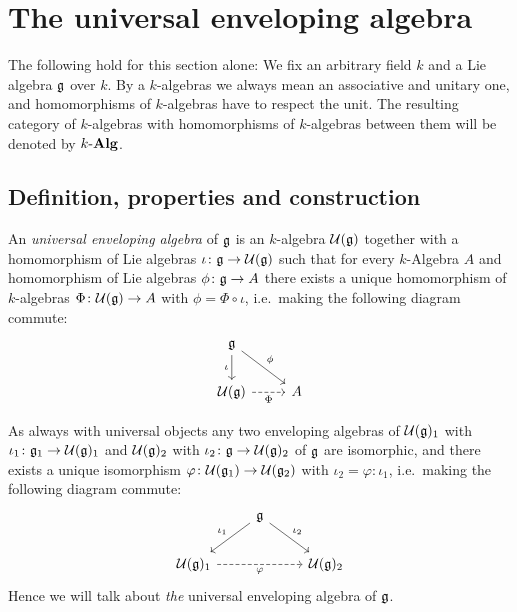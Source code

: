 \section{The universal enveloping algebra}
The following hold for this section alone: We fix an arbitrary field $k$ and a Lie algebra $\mathfrak{g}$ over $k$. By a $k$-algebras we always mean an associative and unitary one, and homomorphisms of $k$-algebras have to respect the unit. The resulting category of $k$-algebras with homomorphisms of $k$-algebras between them will be denoted by $k\text{-}\mathbf{Alg}$.





\subsection{Definition, properties and construction}


\begin{defi}
 An \emph{universal enveloping algebra} of $\mathfrak{g}$ is an $k$-algebra $\mathcal{U}(\mathfrak{g})$ together with a homomorphism of Lie algebras $\iota \colon \mathfrak{g} \to \mathcal{U}(\mathfrak{g})$ such that for every $k$-Algebra $A$ and homomorphism of Lie algebras $\phi \colon \mathfrak{g} \to A$ there exists a unique homomorphism of $k$-algebras $\Phi \colon \mathcal{U}(\mathfrak{g}) \to A$ with $\phi = \Phi \circ \iota$, i.e.\ making the following diagram commute:
  \[
    \begin{tikzcd}
      \g
      \arrow{dr}[above right]{\phi}
      \arrow{d}[left]{\iota}
      &
      {}
      \\
      \Ue(\g)
      \arrow[dashed]{r}[below]{\Phi}
      &
      A
    \end{tikzcd}
  \]
\end{defi}


\begin{rem}
 As always with universal objects any two enveloping algebras of $\mathcal{U}(\mathfrak{g})_1$ with $\iota_1 \colon \mathfrak{g}_1 \to \mathcal{U}(\mathfrak{g})_1$ and $\mathcal{U}(\mathfrak{g})_2$ with $\iota_2 \colon \mathfrak{g} \to \mathcal{U}(\mathfrak{g})_2$ of $\mathfrak{g}$ are isomorphic, and there exists a unique isomorphism $\varphi \colon \mathcal{U}(\mathfrak{g}_1) \to \mathcal{U}(\mathfrak{g}_2)$ with $\iota_2 = \varphi \colon \iota_1$, i.e.\ making the following diagram commute:
 \[
   \begin{tikzcd}
     {}
     &
     \g
     \arrow{dl}[above left]{\iota_1}
     \arrow{dr}[above right]{\iota_2}
     &
     {}
     \\
     \Ue(\g)_1
     \arrow[dashed]{rr}[below]{\varphi}
     &
     {}
     &
     \Ue(\g)_2
   \end{tikzcd}
 \]
 Hence we will talk about \emph{the} universal enveloping algebra of $\mathfrak{g}$.
\end{rem}


